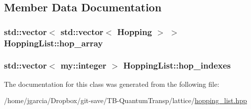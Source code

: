 \subsection{Member Data Documentation}
\hypertarget{classHoppingList_a8fba9bac26eb6fac90ac5801b6bce65f}{
\subsubsection[{hop\+\_\+array}]{\setlength{\rightskip}{0pt plus 5cm}std\+::vector$<$ std\+::vector$<$ {\bf Hopping} $>$ $>$ Hopping\+List\+::hop\+\_\+array\hspace{0.3cm}{\ttfamily [private]}}}\label{classHoppingList_a8fba9bac26eb6fac90ac5801b6bce65f}
\hypertarget{classHoppingList_a842f0a1c53c7ac7b36293aa20e1ff699}{
\subsubsection[{hop\+\_\+indexes}]{\setlength{\rightskip}{0pt plus 5cm}std\+::vector$<$ {\bf my\+::integer} $>$ Hopping\+List\+::hop\+\_\+indexes\hspace{0.3cm}{\ttfamily [private]}}}\label{classHoppingList_a842f0a1c53c7ac7b36293aa20e1ff699}


The documentation for this class was generated from the following file\+:\begin{DoxyCompactItemize}
\item 
/home/jgarcia/\+Dropbox/git-\/save/\+T\+B-\/\+Quantum\+Transp/lattice/\hyperlink{hopping__list_8hpp}{hopping\+\_\+list.\+hpp}\end{DoxyCompactItemize}
